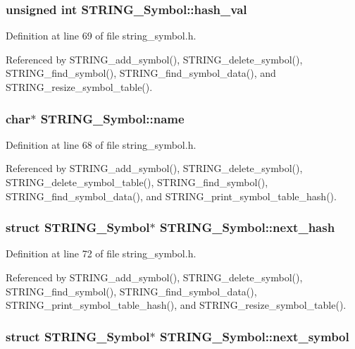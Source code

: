 \subsubsection{\setlength{\rightskip}{0pt plus 5cm}unsigned int \bf{STRING\_\-Symbol::hash\_\-val}}\label{structSTRING__Symbol_9eb6e20b2f3236007168f29d5e3de5d0}




Definition at line 69 of file string\_\-symbol.h.

Referenced by STRING\_\-add\_\-symbol(), STRING\_\-delete\_\-symbol(), STRING\_\-find\_\-symbol(), STRING\_\-find\_\-symbol\_\-data(), and STRING\_\-resize\_\-symbol\_\-table().
\subsubsection{\setlength{\rightskip}{0pt plus 5cm}char$\ast$ \bf{STRING\_\-Symbol::name}}\label{structSTRING__Symbol_a230b56a2e5350706ae5538d41082830}




Definition at line 68 of file string\_\-symbol.h.

Referenced by STRING\_\-add\_\-symbol(), STRING\_\-delete\_\-symbol(), STRING\_\-delete\_\-symbol\_\-table(), STRING\_\-find\_\-symbol(), STRING\_\-find\_\-symbol\_\-data(), and STRING\_\-print\_\-symbol\_\-table\_\-hash().
\subsubsection{\setlength{\rightskip}{0pt plus 5cm}struct \bf{STRING\_\-Symbol}$\ast$ \bf{STRING\_\-Symbol::next\_\-hash}}\label{structSTRING__Symbol_eb440b2ecd9278c2ad8307e77c625faf}




Definition at line 72 of file string\_\-symbol.h.

Referenced by STRING\_\-add\_\-symbol(), STRING\_\-delete\_\-symbol(), STRING\_\-find\_\-symbol(), STRING\_\-find\_\-symbol\_\-data(), STRING\_\-print\_\-symbol\_\-table\_\-hash(), and STRING\_\-resize\_\-symbol\_\-table().
\subsubsection{\setlength{\rightskip}{0pt plus 5cm}struct \bf{STRING\_\-Symbol}$\ast$ \bf{STRING\_\-Symbol::next\_\-symbol}}\label{structSTRING__Symbol_afd60379fc4913c72b86a10dd48d9ac7}




